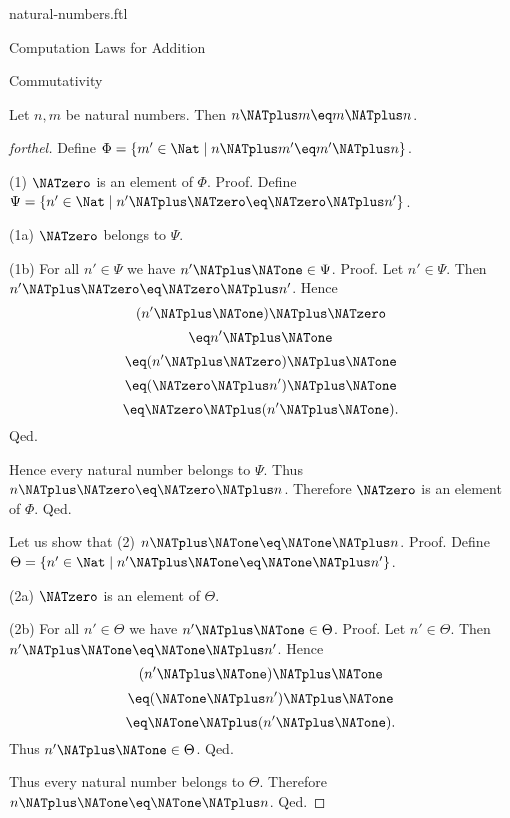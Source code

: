 \documentclass{naproche-library}
\begin{document}
\begin{smodule}[title=Natural Numbers]{natural-numbers.ftl}
\begin{sfragment}{Computation Laws for Addition}
  \begin{sfragment}{Commutativity}
    \begin{proposition}[forthel,id=ARITHMETIC_03_4029553232052224]
      Let $n, m$ be natural numbers.
      Then $n \NATplus m \eq m \NATplus n$.
    \end{proposition}
    \begin{proof}[forthel]
      Define $\Phi = \{ m' \in \Nat \mid n \NATplus m' \eq m' \NATplus n \}$.

      (1) $\NATzero$ is an element of $\Phi$. \newline
      Proof.
        Define $\Psi = \{ n' \in \Nat \mid n' \NATplus \NATzero \eq \NATzero \NATplus n' \}$.

        (1a) $\NATzero$ belongs to $\Psi$.

        (1b) For all $n' \in \Psi$ we have $n' \NATplus \NATone \in \Psi$. \newline
        Proof.
          Let $n' \in \Psi$.
          Then $n' \NATplus \NATzero \eq \NATzero \NATplus n'$.
          Hence
          \[  (n' \NATplus \NATone) \NATplus \NATzero        \]
          \[    \eq n' \NATplus \NATone          \]
          \[    \eq (n' \NATplus \NATzero) \NATplus \NATone    \]
          \[    \eq (\NATzero \NATplus n') \NATplus \NATone    \]
          \[    \eq \NATzero \NATplus (n' \NATplus \NATone).   \]
        Qed.

        Hence every natural number belongs to $\Psi$.
        Thus $n \NATplus \NATzero \eq \NATzero \NATplus n$.
        Therefore $\NATzero$ is an element of $\Phi$.
      Qed.

      Let us show that (2) $n \NATplus \NATone \eq \NATone \NATplus n$. \newline
      Proof.
        Define $\Theta = \{ n' \in \Nat \mid n' \NATplus \NATone \eq \NATone \NATplus n' \}$.

        (2a) $\NATzero$ is an element of $\Theta$.

        (2b) For all $n' \in \Theta$ we have $n' \NATplus \NATone \in \Theta$. \newline
        Proof.
          Let $n' \in \Theta$.
          Then $n' \NATplus \NATone \eq \NATone \NATplus n'$.
          Hence
          \[  (n' \NATplus \NATone) \NATplus \NATone        \]
          \[    \eq (\NATone \NATplus n') \NATplus \NATone    \]
          \[    \eq \NATone \NATplus (n' \NATplus \NATone).   \]
          Thus $n' \NATplus \NATone \in \Theta$.
        Qed.

        Thus every natural number belongs to $\Theta$.
        Therefore $n \NATplus \NATone \eq \NATone \NATplus n$.
      Qed.


\end{proof}
\end{sfragment}
\end{sfragment}
\end{smodule}
\end{document}
